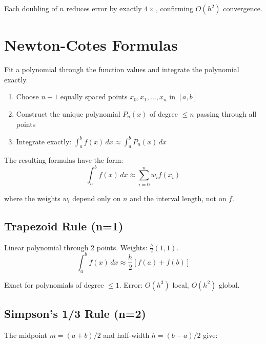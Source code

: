 Each doubling of $n$ reduces error by exactly $4\times$, confirming $O(h^2)$ convergence.




\newpage
\section{Newton-Cotes Formulas}

 Fit a polynomial through the function values and integrate the polynomial exactly.

\begin{enumerate}
    \item Choose $n+1$ equally spaced points $x_0, x_1, \ldots, x_n$ in $[a,b]$
    \item Construct the unique polynomial $P_n(x)$ of degree $\leq n$ passing through all points
    \item Integrate exactly: $\int_a^b f(x)\,dx \approx \int_a^b P_n(x)\,dx$
\end{enumerate}

The resulting formulas have the form:
\begin{equation}
    \int_a^b f(x)\,dx \approx \sum_{i=0}^n w_i f(x_i)
\end{equation}

where the weights $w_i$ depend only on $n$ and the interval length, not on $f$.


\subsection{Trapezoid Rule (n=1)}

Linear polynomial through 2 points. Weights: $\frac{h}{2}(1, 1)$.
\begin{equation}
    \int_a^b f(x) \, dx \approx \frac{h}{2}[f(a) + f(b)]
\end{equation}

Exact for polynomials of degree $\leq 1$. Error: $O(h^3)$ local, $O(h^2)$ global.


\subsection{Simpson's 1/3 Rule (n=2)}

 The midpoint $m = (a+b)/2$ and half-width $h = (b-a)/2$ give:

